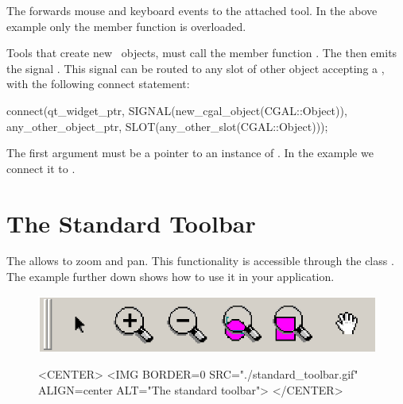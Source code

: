 The  forwards mouse and keyboard events to the attached tool.
In the above example only the  member function is overloaded.

Tools that create new \cgal\ objects, must call the member 
function . The
 then emits the signal
. This signal can be routed to
any slot of other object accepting a , with the
following connect statement:
\begin{ccExampleCode}
connect(qt_widget_ptr, SIGNAL(new_cgal_object(CGAL::Object)), 
        any_other_object_ptr, SLOT(any_other_slot(CGAL::Object)));
\end{ccExampleCode}

The first argument must be a pointer to an instance of .
In the example we connect it to .

\section{The Standard Toolbar}
\label{Qt_widget_standard_toolbar}

The  allows to zoom and pan. This functionality is 
accessible through the class . The 
example further down shows how to use it in your application.

\begin{figure}
\begin{ccTexOnly}
\begin{center}
\includegraphics{standard_toolbar.eps} 
\end{center}
\end{ccTexOnly}
\begin{ccHtmlOnly}
<CENTER>
<IMG BORDER=0 SRC="./standard_toolbar.gif"  ALIGN=center  ALT="The
standard toolbar">
</CENTER>
\end{ccHtmlOnly}
\end{figure}

